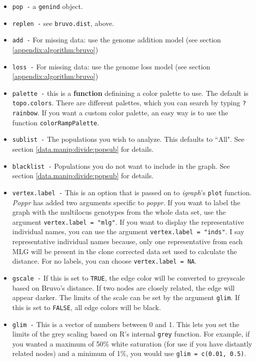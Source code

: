 \documentclass[letterpaper]{article}
\begin{document}
\begin{itemize}
  \item \texttt{pop -} a \texttt{genind} object.
  \item \texttt{replen -} see \texttt{bruvo.dist}, above.
  \item \texttt{add -} For missing data: use the genome addition model (see section \ref{appendix:algorithm:bruvo})
  \item \texttt{loss -} For missing data: use the genome loss model (see section \ref{appendix:algorithm:bruvo})
  \item \texttt{palette -} this is a \textbf{function} definining a color palette to use. The default is \texttt{topo.colors}. There are different palettes, which you can search by typing \texttt{?rainbow}. If you want a custom color palette, an easy way is to use the function \texttt{colorRampPalette}.
  \item \texttt{sublist -} The populations you wish to analyze. This defaults to ``All". See section \ref{data.manip:divide:popsub} for details.
  \item \texttt{blacklist -} Populations you do not want to include in the graph. See section \ref{data.manip:divide:popsub} for details.
  \item \texttt{vertex.label -} This is an option that is passed on to \textit{igraph}'s \texttt{plot} function. \textit{Poppr} has added two arguments specific to \textit{poppr}. If you want to label the graph with the multilocus genotypes from the whole data set, use the argument \texttt{vertex.label = "mlg"}. If you want to display the representative individual names, you can use the argument \texttt{vertex.label = "inds"}. I say representative individual names because, only one representative from each MLG will be present in the clone corrected data set used to calculate the distance. For no labels, you can choose \texttt{vertex.label = NA}. 
  \item \texttt{gscale -} If this is set to \texttt{TRUE}, the edge color will be converted to greyscale based on Bruvo's distance. If two nodes are closely related, the edge will appear darker. The limits of the scale can be set by the argument \texttt{glim}. If this is set to \texttt{FALSE}, all edge colors will be black. 
  \item \texttt{glim -} This is a vector of numbers between 0 and 1. This lets you set the limits of the grey scaling based on R's internal \texttt{grey} function. For example, if you wanted a maximum of 50\% white saturation (for use if you have distantly related nodes) and a minimum of 1\%, you would use \texttt{glim = c(0.01, 0.5)}. 

\end{itemize}
\end{document}
